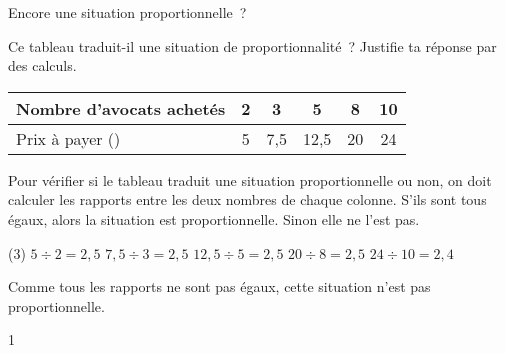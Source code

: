 \documentclass[a4paper,11pt]{report}
\begin{document}
\begin{resolu}{Encore une situation proportionnelle~?}{
Ce tableau traduit-il une situation de proportionnalité~? Justifie ta réponse par des calculs.

\begin{center}
\begin{tabular}{|l|c|c|c|c|c|}\hline
Nombre d'avocats achetés & 2 & 3 & 5 & 8 & 10 \\\hline
Prix à payer (\tunit{}{\fr}) & 5 & 7,5 & 12,5 & 20 & 24\\\hline
\end{tabular}
\end{center}
Pour vérifier si le tableau traduit une situation proportionnelle ou non, on doit calculer les rapports entre les deux nombres de chaque colonne. S'ils sont tous égaux, alors la situation est proportionnelle. Sinon elle ne l'est pas.
\begin{tasks}(3)
\task[] $5 \div 2 = 2,5$
\task[] $7,5 \div 3 =2,5$
\task[] $12,5 \div 5 =2,5$
\task[]$20 \div 8 =2,5$
\task[] $24 \div 10 =2,4$
\end{tasks}
Comme tous les rapports ne sont pas égaux, cette situation n'est pas proportionnelle.
}{1}
\end{resolu}
\end{document}
